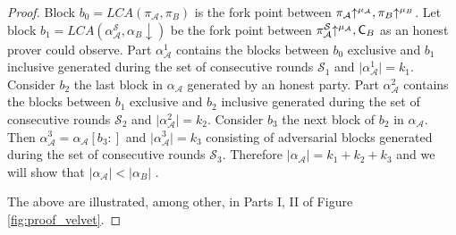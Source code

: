 \begin{proof}
Block $b_0 = LCA(\pi_\mathcal{A}, \pi_B)$ is the fork point between $\pi_\mathcal{A} \negthickspace\uparrow^{\mu_\mathcal{A}}, \pi_B \negthickspace\uparrow^{\mu_B}$. Let block $b_1 = LCA (\alpha^{\mathcal{S}}_\mathcal{A}, \alpha_B \downarrow)$ be the fork point between $\pi^{\mathcal{S}}_\mathcal{A} \negthickspace\uparrow^{\mu_\mathcal{A}}, \mathsf{C}_B $ as an honest prover could observe. Part $\alpha_\mathcal{A}^1$ contains the blocks between $b_0$ exclusive and $b_1$ inclusive generated during the set of consecutive rounds $\mathcal{S}_1$ and $\lvert  \alpha_\mathcal{A}^1 \rvert = k_1$. Consider $b_2$ the last block in $\alpha_\mathcal{A}$ generated by an honest party. Part $\alpha_{\mathcal{A}}^2$ contains the blocks between $b_1$ exclusive and $b_2$ inclusive generated during the set of consecutive rounds $\mathcal{S}_2$ and $\vert  \alpha_\mathcal{A}^2 \vert = k_2$. Consider $b_3$ the next block of $b_2$ in $\alpha_\mathcal{A}$. Then $\alpha_{\mathcal{A}}^3 = \alpha_\mathcal{A}[b_3{:}]$ and $\vert  \alpha_\mathcal{A}^3 \vert = k_3$ consisting of adversarial blocks generated during the set of consecutive rounds $\mathcal{S}_3$. Therefore $\vert \alpha_\mathcal{A} \vert = k_1 + k_2 + k_3$ and we will show that $\vert \alpha_\mathcal{A} \vert < \vert \alpha_B \vert$ .

The above are illustrated, among other, in Parts I, II of Figure \ref{fig:proof_velvet}.


\end{proof}
